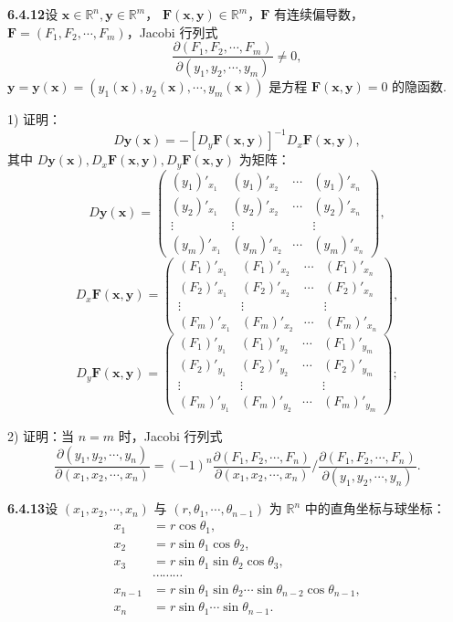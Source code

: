 \documentclass[UTF8,12pt,a4paper,fontset=fandol]{ctexart}
\begin{document}
\noindent\textbf{6.4.12}\quad 设 $\mathbf x\in\mathbb R^n,\mathbf y\in\mathbb R^m$，
$\mathbf F(\mathbf x,\mathbf y)\in\mathbb R^m$，$\mathbf F$ 有连续偏导数，
$\mathbf F=(F_1,F_2,\cdots,F_m)$，Jacobi 行列式
\[
  \frac{\partial(F_1,F_2,\cdots,F_m)}
       {\partial(y_1,y_2,\cdots,y_m)}\ne0,
\]
$\mathbf y=\mathbf y(\mathbf x)=(y_1(\mathbf x),y_2(\mathbf x),\cdots,y_m(\mathbf x))$
是方程 $\mathbf F(\mathbf x,\mathbf y)=0$ 的隐函数.

1) 证明：
\[
  D\mathbf y(\mathbf x)=-[D_y\mathbf F(\mathbf x,\mathbf y)]^{-1}D_x\mathbf F(\mathbf x,\mathbf y),
\]
其中 $D\mathbf y(\mathbf x),D_x\mathbf F(\mathbf x,\mathbf y),D_y\mathbf F(\mathbf x,\mathbf y)$ 为矩阵：
\[
D\mathbf y(\mathbf x)=
\begin{pmatrix}
  (y_1)'_{x_1} & (y_1)'_{x_2} & \cdots & (y_1)'_{x_n}\\
  (y_2)'_{x_1} & (y_2)'_{x_2} & \cdots & (y_2)'_{x_n}\\
  \vdots & \vdots & & \vdots\\
  (y_m)'_{x_1} & (y_m)'_{x_2} & \cdots & (y_m)'_{x_n}
\end{pmatrix},
\]
\[
D_x\mathbf F(\mathbf x,\mathbf y)=
\begin{pmatrix}
  (F_1)'_{x_1} & (F_1)'_{x_2} & \cdots & (F_1)'_{x_n}\\
  (F_2)'_{x_1} & (F_2)'_{x_2} & \cdots & (F_2)'_{x_n}\\
  \vdots & \vdots & & \vdots\\
  (F_m)'_{x_1} & (F_m)'_{x_2} & \cdots & (F_m)'_{x_n}
\end{pmatrix},
\]
\[
D_y\mathbf F(\mathbf x,\mathbf y)=
\begin{pmatrix}
  (F_1)'_{y_1} & (F_1)'_{y_2} & \cdots & (F_1)'_{y_m}\\
  (F_2)'_{y_1} & (F_2)'_{y_2} & \cdots & (F_2)'_{y_m}\\
  \vdots & \vdots & & \vdots\\
  (F_m)'_{y_1} & (F_m)'_{y_2} & \cdots & (F_m)'_{y_m}
\end{pmatrix};
\]

2) 证明：当 $n=m$ 时，Jacobi 行列式
\[
  \frac{\partial(y_1,y_2,\cdots,y_n)}
       {\partial(x_1,x_2,\cdots,x_n)}
  =
  (-1)^n
  \frac{\partial(F_1,F_2,\cdots,F_n)}
       {\partial(x_1,x_2,\cdots,x_n)}
  \bigg/
  \frac{\partial(F_1,F_2,\cdots,F_n)}
       {\partial(y_1,y_2,\cdots,y_n)}.
\]

\noindent\textbf{6.4.13}\quad 设 $(x_1,x_2,\cdots,x_n)$ 与
$(r,\theta_1,\cdots,\theta_{n-1})$ 为 $\mathbb R^n$ 中的直角坐标与球坐标：
\[
\begin{aligned}
  x_1&=r\cos\theta_1,\\
  x_2&=r\sin\theta_1\cos\theta_2,\\
  x_3&=r\sin\theta_1\sin\theta_2\cos\theta_3,\\
  &\cdots\cdots\cdots\\
  x_{n-1}&=r\sin\theta_1\sin\theta_2\cdots\sin\theta_{n-2}\cos\theta_{n-1},\\
  x_n&=r\sin\theta_1\cdots\sin\theta_{n-1}.
\end{aligned}
\]
\end{document}
